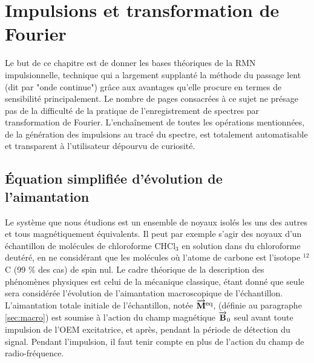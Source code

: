 \chapter[RMN par TF]{Impulsions et transformation de Fourier}
\label{chap:bloch}

Le but de ce chapitre est de donner les bases théoriques de la
RMN impulsionnelle, technique qui a largement supplanté la
méthode du passage lent (dit par "onde continue")
grâce aux avantages qu'elle procure en termes de sensibilité
principalement.
Le nombre de pages consacrées à ce sujet ne présage pas de la
difficulté de la pratique de l'enregistrement de spectres par
transformation de Fourier.
L'enchaînement de toutes les opérations mentionnées,
de la génération des impulsions au tracé du spectre,
est totalement automatisable et transparent à l'utilisateur
dépourvu de curiosité.

\section{Équation simplifiée d'évolution de l'aimantation}
Le système que nous étudions est un ensemble de noyaux isolés les uns des
autres et tous magnétiquement équivalents.
Il peut par exemple s'agir des noyaux \prot d'un échantillon de
molécules de chloroforme CHCl$_3$ en solution dans du chloroforme deutéré,
en ne considérant que les molécules où l'atome de carbone est l'isotope
$^{12}$C (99 \% des cas) de spin nul.
Le cadre théorique de la description des phénomènes physiques
est celui de la mécanique classique, étant donné que
seule sera considérée l'évolution de l'aimantation macroscopique
de l'échantillon.
L'aimantation totale initiale de l'échantillon, notée $\overrightarrow{\mathbf{M}}^{\mbox{\footnotesize{eq}}}$,
(définie au paragraphe \ref{sec:macro}) est soumise à
l'action du champ magnétique $\overrightarrow{\mathbf{B}}_0$ seul avant toute
impulsion de l'OEM excitatrice, et après, pendant la
période de détection du signal.
Pendant l'impulsion, il faut tenir compte en plus de
l'action du champ de radio-fréquence.

